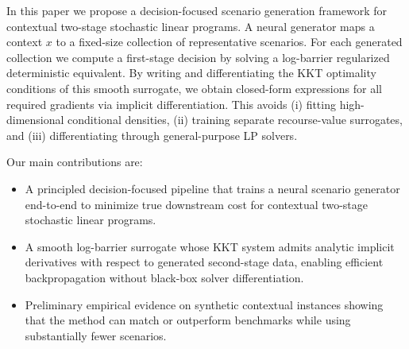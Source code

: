 \documentclass{article}
\begin{document}

In this paper we propose a decision-focused scenario generation framework for
contextual two-stage stochastic linear programs.
A neural generator maps a context $x$ to a fixed-size collection of
representative scenarios.
For each generated collection we compute a first-stage decision by solving a
log-barrier regularized deterministic equivalent.
By writing and differentiating the KKT optimality conditions of this smooth
surrogate, we obtain closed-form expressions for all required gradients via
implicit differentiation.
This avoids (i) fitting high-dimensional conditional densities, (ii) training
separate recourse-value surrogates, and (iii) differentiating through
general-purpose LP solvers.

Our main contributions are:
\begin{itemize}
    \item A principled decision-focused pipeline that trains a neural scenario generator end-to-end to minimize true downstream cost for contextual two-stage stochastic linear programs.
    \item A smooth log-barrier surrogate whose KKT system admits analytic implicit derivatives with respect to generated second-stage data, enabling efficient backpropagation without black-box solver differentiation.
    \item Preliminary empirical evidence on synthetic contextual instances showing that the method can match or outperform benchmarks while using substantially fewer scenarios.
\end{itemize}
\end{document}
